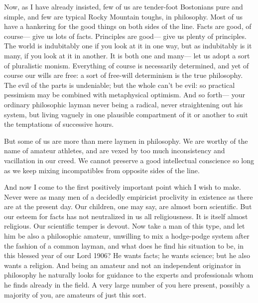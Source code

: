 \documentclass[]{article}
\begin{document}
Now, as I have already insisted, few of us are tender-foot Bostonians
pure and simple, and few are typical Rocky Mountain toughs, in
philosophy. Most of us have a hankering for the good things on both
sides of the line. Facts are good, of course--- give us lots of facts.
Principles are good--- give us plenty of principles. The world is
indubitably one if you look at it in one way, but as indubitably is
it many, if you look at it in another. It is both one and many--- let us
adopt a sort of pluralistic monism. Everything of course is necessarily
determined, and yet of course our wills are free: a sort of free-will
determinism is the true philosophy. The evil of the parts is undeniable;
but the whole can't be evil: so practical pessimism may be combined with
metaphysical optimism. And so forth--- your ordinary philosophic layman
never being a radical, never straightening out his system, but living
vaguely in one plausible compartment of it or another to suit the
temptations of successive hours.

But some of us are more than mere laymen in philosophy. We are worthy
of the name of amateur athletes, and are vexed by too much inconsistency
and vacillation in our creed. We cannot preserve a good intellectual
conscience so long as we keep mixing incompatibles from opposite sides
of the line.

And now I come to the first positively important point which I wish to
make. Never were as many men of a decidedly empiricist proclivity in
existence as there are at the present day. Our children, one may say,
are almost born scientific. But our esteem for facts has not neutralized
in us all religiousness. It is itself almost religious. Our scientific
temper is devout. Now take a man of this type, and let him be also a
philosophic amateur, unwilling to mix a hodge-podge system after the
fashion of a common layman, and what does he find his situation to be,
in this blessed year of our Lord 1906? He wants facts; he wants
science; but he also wants a religion. And being an amateur and not an
independent originator in philosophy he naturally looks for guidance to
the experts and professionals whom he finds already in the field. A
very large number of you here present, possibly a majority of you, are
amateurs of just this sort.
\end{document}
